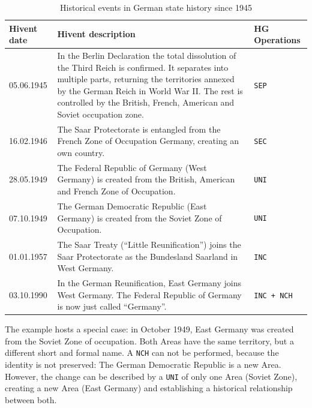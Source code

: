 \begin{table}[ht]
\begin{center}
\begin{tabular}{l p{8.5cm} l}
  \toprule
  Hivent date & Hivent description & HG Operations \\
  \midrule

    05.06.1945
  & \footnotesize{In the Berlin Declaration the total dissolution of the Third Reich is confirmed. It separates into multiple parts, returning the territories annexed by the German Reich in World War II. The rest is controlled by the British, French, American and Soviet occupation zone.}
  & \texttt{SEP} \\

    16.02.1946
  & \footnotesize{The Saar Protectorate is entangled from the French Zone of Occupation Germany, creating an own country.}
  & \texttt{SEC} \\

    28.05.1949
  & \footnotesize{The Federal Republic of Germany (West Germany) is created from the British, American and French Zone of Occupation.}
  & \texttt{UNI} \\

    07.10.1949
  & \footnotesize{The German Democratic Republic (East Germany) is created from the Soviet Zone of Occupation.}
  & \texttt{UNI} \\

    01.01.1957
  & \footnotesize{The Saar Treaty (``Little Reunification'') joins the Saar Protectorate as the Bundesland Saarland in West Germany.}
  & \texttt{INC} \\

    03.10.1990
  & \footnotesize{In the German Reunification, East Germany joins West Germany. The Federal Republic of Germany is now just called ``Germany''.}
  & \texttt{INC + NCH} \\

  \bottomrule
\end{tabular}
\caption{Historical events in German state history since 1945}
\label{tab:german_history_since_1945}
\end{center}
\end{table}

The example hosts a special case: in October 1949, East Germany was created from the Soviet Zone of occupation. Both Areas have the same territory, but a different short and formal name. A \texttt{NCH} can not be performed, because the identity is not preserved: The German Democratic Republic is a new Area. However, the change can be described by a \texttt{UNI} of only one Area (Soviet Zone), creating a new Area (East Germany) and establishing a historical relationship between both.

